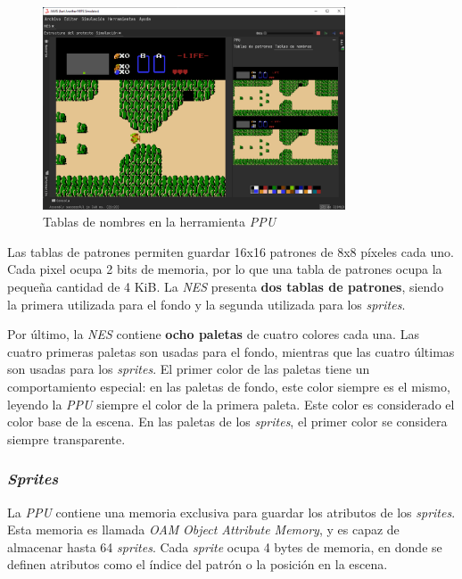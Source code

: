\begin{figure}[h]
    \centering
    \includegraphics[width=0.8\textwidth]{images/nes/nes-nametables}
    \caption{Tablas de nombres en la herramienta \textit{PPU}}
    \label{fig:nes-nametables}
\end{figure}

Las tablas de patrones permiten guardar 16x16 patrones de
8x8 píxeles cada uno.
Cada pixel ocupa 2 bits de memoria, por lo que una tabla
de patrones ocupa la pequeña cantidad de 4 KiB.
La \textit{NES} presenta \textbf{dos tablas de patrones}, siendo
la primera utilizada para el fondo y la segunda utilizada
para los \textit{sprites}.

Por último, la \textit{NES} contiene \textbf{ocho paletas}
de cuatro colores cada una.
Las cuatro primeras paletas son usadas para el fondo,
mientras que las cuatro últimas son usadas para los \textit{sprites}.
El primer color de las paletas tiene un comportamiento especial:
en las paletas de fondo, este color siempre es el mismo,
leyendo la \textit{PPU} siempre el color de la primera paleta.
Este color es considerado el color base de la escena.
En las paletas de los \textit{sprites}, el primer color
se considera siempre transparente.

\subsubsection{\textit{Sprites}}\label{subsubsec:sprites}

La \textit{PPU} contiene una memoria exclusiva para guardar
los atributos de los \textit{sprites}.
Esta memoria es llamada \textit{OAM}  \textit{Object Attribute Memory},
y es capaz de almacenar hasta 64 \textit{sprites}.
Cada \textit{sprite} ocupa 4 bytes de memoria, en donde se
definen atributos como el índice del patrón o la posición en la escena.

